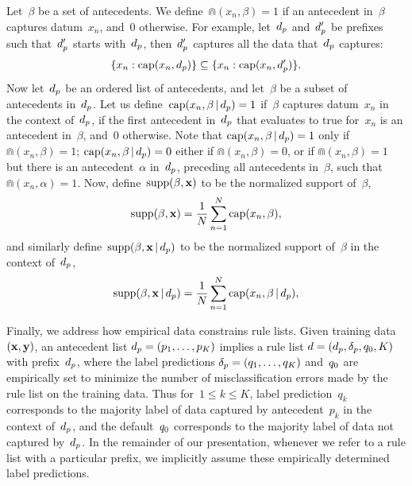 Let~$\beta$ be a set of antecedents.
%
We define~${\Cap(x_n, \beta) = 1}$ if an antecedent in~$\beta$
captures datum~$x_n$, and~0 otherwise.
%
For example, let~$d_p$ and~$d_p'$ be prefixes such that~$d_p'$ starts
with~$d_p$, then~$d_p'$ captures all the data that~$d_p$ captures:
\begin{align}
\{x_n: \Cap(x_n, \Prefix)\} \subseteq \{x_n: \Cap(x_n, \Prefix')\}.
\label{eq:cap-subset}
\end{align}
Now let~$d_p$ be an ordered list of antecedents,
and let~$\beta$ be a subset of antecedents in~$d_p$.
%
Let us define~${\textnormal{cap}(x_n, \beta \,|\, d_p) = 1}$ if~$\beta$
captures datum~$x_n$ in the context of~$d_p$,
\ie if the first antecedent in~$d_p$ that evaluates to true for~$x_n$
is an antecedent in~$\beta$,
and~0 otherwise.
%
Note that ${\textnormal{cap}(x_n, \beta \,|\, d_p) = 1}$ only if ${\Cap(x_n, \beta) = 1}$;
${\textnormal{cap}(x_n, \beta \,|\, d_p) = 0}$ either if ${\Cap(x_n, \beta) = 0}$,
or if ${\Cap(x_n, \beta) = 1}$ but there is an antecedent~$\alpha$ in~$d_p$,
preceding all antecedents in~$\beta$, such that ${\Cap(x_n, \alpha) = 1}$.
%
Now, define~${\textnormal{supp}(\beta, \mathbf{x})}$ to be the normalized support of~$\beta$,
\begin{align}
\Supp(\beta, \x) = \frac{1}{N} \sum_{n=1}^N \Cap(x_n, \beta),
\label{eq:support}
\end{align}
and similarly define~${\textnormal{supp}(\beta, \mathbf{x} \,|\, d_p)}$
to be the normalized support of~$\beta$ in the context of~$d_p$,
\begin{align}
\Supp(\beta, \x \given \Prefix) = \frac{1}{N} \sum_{n=1}^N \Cap(x_n, \beta \given \Prefix),
\label{eq:support-context}
\end{align}

Finally, we address how empirical data constrains rule lists.
%
Given training data~${(\mathbf{x}, \mathbf{y})}$,
an antecedent list ${d_p = (p_1, \dots, p_K)}$
implies a rule list ${{d} = (d_p, \delta_p, q_0, K)}$
with prefix~$d_p$, where the label predictions
${\delta_p = (q_1, \dots, q_K)}$ and~$q_0$ are empirically set
to minimize the number of misclassification errors made by
the rule list on the training data.
%
Thus for~${1 \le k \le K}$, label prediction~$q_k$ corresponds to the
majority label of data captured by antecedent~$p_k$ in the context of~$d_p$,
and the default~$q_0$ corresponds to the majority label of data
not captured by~$d_p$.
%
In the remainder of our presentation, whenever we refer to a rule list with a
particular prefix, we implicitly assume these empirically determined label predictions.

